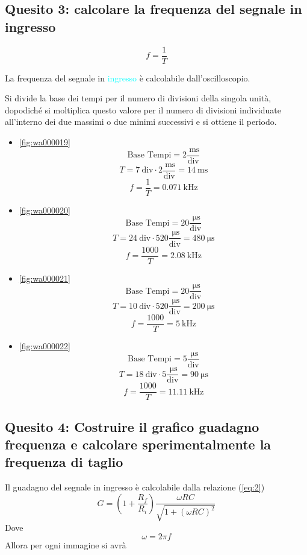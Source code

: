 \documentclass[a4paper, 12pt, twoside]{report}
\begin{document}
\subsection{Quesito 3: calcolare la frequenza del segnale in ingresso}

\[f = \dfrac{1}{T}\]

La frequenza del segnale in \textcolor{cyan}{ingresso} è calcolabile dall'oscilloscopio. 

Si divide la base dei tempi per il numero di divisioni della singola unità, dopodiché si moltiplica questo valore per il numero di divisioni individuate all'interno dei due massimi o due minimi successivi e si ottiene il periodo.

\begin{itemize}
	\item \ref{fig:wa000019}
	\[\text{Base Tempi} = 2\dfrac{\SI{}{\milli\second}}{\text{div}}\]
	\[T = 7~\text{div}\cdot2\dfrac{\SI{}{\milli\second}}{\text{div}} = \SI{14}{\milli\second}\]
	\[f = \dfrac{1}{T} = \SI{0.071}{\kilo\hertz}\]
	
	\item \ref{fig:wa000020}
	\[\text{Base Tempi} = 20\dfrac{\SI{}{\micro\second}}{\text{div}}\]
	\[T = 24~\text{div}\cdot520\dfrac{\SI{}{\micro\second}}{\text{div}} = \SI{480}{\micro\second}\]
	\[f = \dfrac{1000}{T} = \SI{2.08}{\kilo\hertz}\]
	
	\item \ref{fig:wa000021}
	\[\text{Base Tempi} = 20\dfrac{\SI{}{\micro\second}}{\text{div}}\]
	\[T = 10~\text{div}\cdot520\dfrac{\SI{}{\micro\second}}{\text{div}} = \SI{200}{\micro\second}\]
	\[f = \dfrac{1000}{T} = \SI{5}{\kilo\hertz}\]
	
	\item \ref{fig:wa000022}
	\[\text{Base Tempi} = 5\dfrac{\SI{}{\micro\second}}{\text{div}}\]
	\[T = 18~\text{div}\cdot5\dfrac{\SI{}{\micro\second}}{\text{div}} = \SI{90}{\micro\second}\]
	\[f = \dfrac{1000}{T} = \SI{11.11}{\kilo\hertz}\]
\end{itemize}

\newpage

\subsection{Quesito 4: Costruire il grafico guadagno frequenza e calcolare sperimentalmente la frequenza di taglio}

Il guadagno del segnale  in ingresso è calcolabile dalla relazione (\ref{eq:2})
\[G = \left(1+\dfrac{R_f}{R_i}\right)\dfrac{\omega RC}{\sqrt{1+(\omega RC)^2}}\]
Dove 
\[\omega = 2\pi f\]
Allora per ogni immagine si avrà
\end{document}
